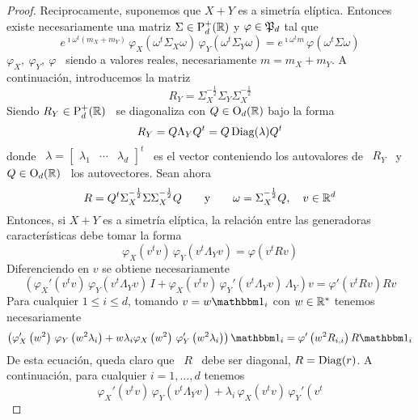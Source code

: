 \begin{proof}
  Reciprocamente,  suponemos que  $X+Y$  es a  simetr\'ia el\'iptica.   Entonces
  existe necesariamente  una matriz $\Sigma \in \mathrm{P}_d^+(\mathbb{R})$  y $\varphi \in
  \mathfrak{P}_d$ tal que
  \[
  e^{\imath  \omega^t   (m_X  +  m_Y)}  \,   \varphi_X\left(  \omega^t  \Sigma_X
    \omega\right) \, \varphi_Y\left( \omega^t \Sigma_Y \omega\right) = e^{\imath
    \omega^t m} \, \varphi\left( \omega^t \Sigma \omega\right)
  \]
  $\varphi_X,   \:  \varphi_Y,   \:  \varphi$   \  siendo   a   valores  reales,
  necesariamente $m = m_X + m_Y$. A continuaci\'on, introducemos la matriz
  \[
  R_Y  = \Sigma_X^{-\frac12} \Sigma_Y  \Sigma_X^{-\frac12}
  \]
  Siendo $R_Y  \in \mathrm{P}_d^+(\mathbb{R})$ \  se diagonaliza con $Q  \in \mathrm{O}_d(\mathbb{R})$
  bajo la forma~\cite{Bha97, Bha07, HorJoh13}
  \[
  R_Y = Q \Lambda_Y Q^t = Q \operatorname{Diag}(\lambda) Q^t
  \]
  donde    \    $\lambda    =    \begin{bmatrix}   \lambda_1    &    \cdots    &
    \lambda_d \end{bmatrix}^t$ \  es el vector conteniendo los  autovalores de \
  $R_Y$ \ y \ $Q \in \mathrm{O}_d(\mathbb{R})$ \ los autovectores. Sean ahora
  \[
  R  =  Q^t \Sigma_X^{-\frac12}  \Sigma  \Sigma_X^{-\frac12}  Q \qquad  \mbox{y}
  \qquad \omega = \Sigma_X^{-\frac12} Q, \quad v \in \mathbb{R}^d
  \]
  Entonces,  si  $X+Y$ es  a  simetr\'ia  el\'iptica,  la relaci\'on  entre  las
  generadoras caracter\'isticas debe tomar la forma
  \[
  \varphi_X\left( v^t  v \right)  \, \varphi_Y\left( v^t  \Lambda_Y v  \right) =
  \varphi\left( v^t R v \right)
  \]
  Diferenciendo en $v$ se obtiene necesariamente
  \[
  \left( \varphi_X'\left( v^t v  \right) \, \varphi_Y\left( v^t \Lambda_Y v
    \right) \,  I + \varphi_X\left(  v^t v \right) \,  \varphi_Y'\left( v^t
      \Lambda_Y  v \right)  \,  \Lambda_Y \right)  v  = \varphi'\left(  v^t R  v
  \right) R v
  \]
  Para cualquier  $1 \le i  \le d$, tomando  $v = w  \un_i$ con $w  \in \mathbb{R}^*$
  tenemos necesariamente
  \[
  \left( \varphi_X'\left( w^2 \right) \, \varphi_Y\left( w^2 \lambda_i \right) +
    w \lambda_i  \varphi_X\left( w^2  \right) \, \varphi_Y'\left(  w^2 \lambda_i
    \right) \right) \un_i = \varphi'\left( w^2 R_{i,i} \right) R \un_i
  \]
  De esta ecuaci\'on, queda claro que \ $R$ \ debe ser diagonal, $R = \operatorname{Diag}(r)$.
  A continuaci\'on, para cualquier $i = 1 , \ldots , d$ tenemos
  \[
  \varphi_X'\left( v^t v \right) \, \varphi_Y\left( v^t \Lambda_Y v \right)
  +  \lambda_i \,  \varphi_X\left( v^t  v \right)  \,  \varphi_Y'\left( v^t
\]
\end{proof}

